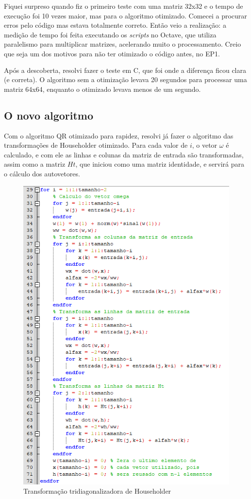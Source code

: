 \documentclass[12pt]{article} %
\begin{document}
            Fiquei surpreso quando fiz o primeiro teste com uma matriz 32x32 e o tempo de execução foi 10 vezes maior, mas para o algoritmo otimizado. Comecei a procurar erros pelo código mas estava totalmente correto. Então veio a realização: a medição de tempo foi feita executando os \textit{scripts} no Octave, que utiliza paralelismo para multiplicar matrizes, acelerando muito o processamento. Creio que seja um dos motivos para não ter otimizado o código antes, no EP1.
            
            Após a descoberta, resolvi fazer o teste em C, que foi onde a diferença ficou clara (e correta). O algoritmo sem a otimização levava 20 segundos para processar uma matriz 64x64, enquanto o otimizado levava menos de um segundo.
            
        \subsection{O novo algoritmo}
            
            Com o algoritmo QR otimizado para rapidez, resolvi já fazer o algoritmo das transformações de Householder otimizado. Para cada valor de $i$, o vetor $\omega$ é calculado, e com ele as linhas e colunas da matriz de entrada são transformadas, assim como a matriz $Ht$, que iniciou como uma matriz identidade, e servirá para o cálculo dos autovetores.
            
            \begin{figure}[H]
                \centering
                \includegraphics[width=0.75\linewidth]{Tridiagonalizacao.png}
                \caption{Transformação tridiagonalizadora de Householder}
                \label{fig:tridiag}
            \end{figure}
            
\end{document}
